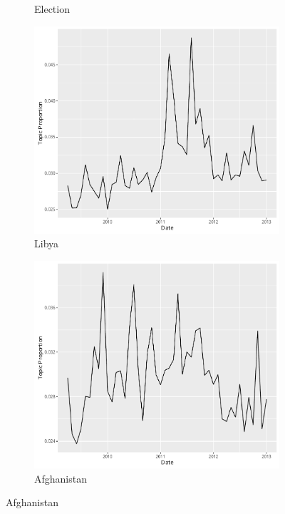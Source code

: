 \documentclass[12pt]{article}
\theoremstyle{definition}
\theoremstyle{algodesc}
\begin{document}
\begin{figure}[htb]
\begin{subfigure}[Election]{.30\linewidth}
    \caption{Election} \label{fig:t2}
\end{subfigure}
\begin{subfigure}[Libya]{.30\linewidth}
    \includegraphics[width=\linewidth]{../images/time_plot18.pdf}
    \caption{Libya} \label{fig:t3}
\end{subfigure}
\begin{subfigure}[Afghanistan]{.30\linewidth}
    \includegraphics[width=\linewidth]{../images/time_plot27.pdf}
    \caption{Afghanistan} \label{fig:t4}

\end{subfigure}
\end{figure}
\end{document}

